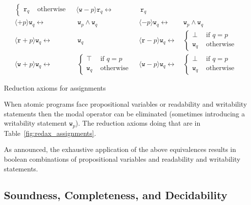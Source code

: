 \documentclass{llncs}
\newcommand{\readable}[1]{\mathtt{r}_{#1}}
\newcommand{\writable}[1]{\mathtt{w}_{#1}}
\newcommand{\assgntopR}[1]{{\mathtt r {+} #1}}
\newcommand{\assgnbotR}[1]{{\mathtt r {-} #1}}
\newcommand{\assgntopW}[1]{{\mathtt w {+} #1}}
\newcommand{\assgnbotW}[1]{{\mathtt w {-} #1}}
\newcommand{\assgntopV}[1]{{\mathtt {+} #1}}
\newcommand{\assgnbotV}[1]{{\mathtt {-} #1}}
\newcommand{\ldia}[1]{ \big\langle #1 \big\rangle}
\newcommand{\leqv}{ \leftrightarrow }
\begin{document}
\begin{table}[t]
\begin{align*}
\begin{cases}
                \readable q & \text{ otherwise }
                \end{cases}
& \ldia{\assgnbotW p} \readable q \leqv &\ \readable q
%
\\
\ldia{\assgntopV p } \writable{q} \leqv &\ \writable{p} \land \writable{q}
& \ldia{\assgnbotV p } \writable{q} \leqv &\ \writable{p} \land \writable{q}
\\
\ldia{\assgntopR p } \writable{q} \leqv &\ \writable{q}
& \ldia{\assgnbotR p } \writable{q} \leqv &\ \begin{cases}
                \bot & \text{ if } q = p \\
                \writable{q} & \text{ otherwise } 
								\end{cases}
\\
\ldia{\assgntopW p } \writable{q} \leqv &\ \begin{cases}
								\top & \text{ if } q = p \\
								\writable{q} & \text{ otherwise }
								\end{cases}
& \ldia{\assgnbotW p } \writable{q} \leqv &\ \begin{cases}
								\bot & \text{ if } q = p \\
								\writable{q} & \text{ otherwise }
								\end{cases}
\end{align*}
\caption{Reduction axioms for assignments
\label{fig:redax_assignments}
}
\end{table}

When atomic programs face propositional variables or readability and writability statements 
then the modal operator can be eliminated (sometimes introducing a writability statement $\writable{p}$). 
The reduction axioms doing that are in Table~\ref{fig:redax_assignments}.

As announced, the exhaustive application of the above equivalences results in boolean combinations of 
propositional variables and readability and writability statements. 

\subsection{Soundness, Completeness, and Decidability} 
\end{document}
